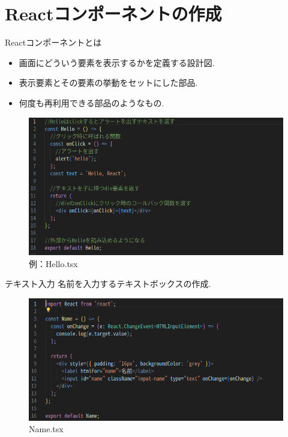 \documentclass[aspectratio=169]{beamer}
\begin{document}
\section{Reactコンポーネントの作成}
\begin{frame}{Reactコンポーネントとは}
    \begin{itemize}
        \item 画面にどういう要素を表示するかを定義する設計図.
        \item 表示要素とその要素の挙動をセットにした部品.
        \item 何度も再利用できる部品のようなもの.
    \end{itemize}
    \begin{figure}
        \centering
       \includegraphics[scale=0.35]{Hello_tsx.png}
       \caption{例：Hello.tsx}
    \end{figure}
\end{frame}

\begin{frame}{テキスト入力}
    名前を入力するテキストボックスの作成.
    \begin{figure}
        \centering
       \includegraphics[scale=0.35]{Name_tsx.png}
       \caption{Name.tsx}
    \end{figure}
\end{frame}
\end{document}
